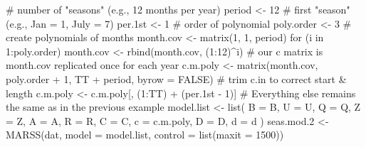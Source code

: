 \begin{Schunk}
\begin{Sinput}
 # number of "seasons" (e.g., 12 months per year)
 period <- 12
 # first "season" (e.g., Jan = 1, July = 7)
 per.1st <- 1
 # order of polynomial
 poly.order <- 3
 # create polynomials of months
 month.cov <- matrix(1, 1, period)
 for (i in 1:poly.order) {
   month.cov <- rbind(month.cov, (1:12)^i)
 }
 # our c matrix is month.cov replicated once for each year
 c.m.poly <- matrix(month.cov, poly.order + 1, TT + period, byrow = FALSE)
 # trim c.in to correct start & length
 c.m.poly <- c.m.poly[, (1:TT) + (per.1st - 1)]
 # Everything else remains the same as in the previous example
 model.list <- list(
   B = B, U = U, Q = Q, Z = Z, A = A, R = R,
   C = C, c = c.m.poly, D = D, d = d
 )
 seas.mod.2 <- MARSS(dat, model = model.list, control = list(maxit = 1500))
\end{Sinput}
\end{Schunk}
